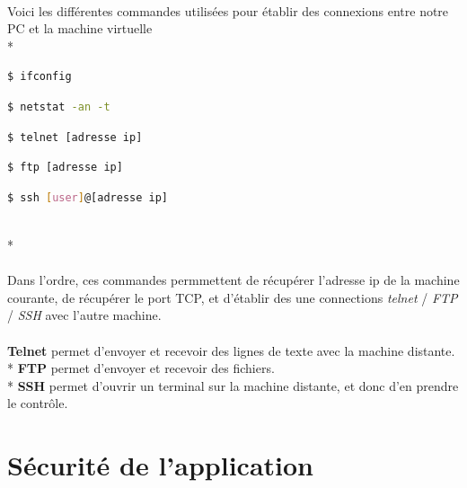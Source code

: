 \documentclass{article}
\begin{document}
\paragraph{}
Voici les différentes commandes utilisées pour établir des connexions entre notre PC et la machine virtuelle \\*
\begin{tcolorbox}
\begin{lstlisting}[language=sh]
$ ifconfig
\end{lstlisting}
\begin{lstlisting}[language=sh]
$ netstat -an -t
\end{lstlisting}
\begin{lstlisting}[language=sh]
$ telnet [adresse ip]
\end{lstlisting}
\begin{lstlisting}[language=sh]
$ ftp [adresse ip]
\end{lstlisting}
\begin{lstlisting}[language=sh]
$ ssh [user]@[adresse ip]
\end{lstlisting}
\end{tcolorbox}
~\\*
\paragraph{}
Dans l'ordre, ces commandes permmettent de récupérer l'adresse ip de la machine courante, de récupérer le port TCP, et d'établir des une connections \textit{telnet} / \textit{FTP} / \textit{SSH} avec l'autre machine.

\paragraph{}
\textbf{Telnet} permet d'envoyer et recevoir des lignes de texte avec la machine distante. \\*
\textbf{FTP} permet d'envoyer et recevoir des fichiers. \\*
\textbf{SSH} permet d'ouvrir un terminal sur la machine distante, et donc d'en prendre le contrôle.
 

\section{Sécurité de l'application}
\end{document}

